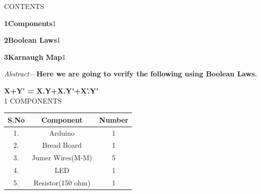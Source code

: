 \documentclass[a4paper,12pt]{report}
\begin{document}
\begin{multicols}{2}
\centering \large\textsc{C}\footnotesize\textsc{ONTENTS}\vspace{5mm}
\\
\raggedright\large\textbf{1\hspace{1cm}Components}\hspace{4.18cm}1\vspace{5mm}\\
\raggedright\large\textbf{2\hspace{1cm}Boolean Laws}\hspace{3.85cm}1\vspace{5mm}\\
\raggedright\large\textbf{3\hspace{1cm}Karnaugh Map}\hspace{3.5cm}1\vspace{5mm}\\


\raggedright\hspace{1cm}\normalsize\textsl{Abstract---}\normalsize\textbf{Here we are going to verify the following using Boolean Laws.}\vspace{1mm}\\
\raggedright\small\textbf{X+Y' = X.Y+X.Y'+X'.Y'}\vspace{5mm}\\


\centering \large\textsc{1  C}\footnotesize\textsc{OMPONENTS}\vspace{5mm}\\
\begin{center}
    \label{tab:truthtable}
    \setlength{\arrayrulewidth}{0.2mm}
\setlength{\tabcolsep}{5pt}
\renewcommand{\arraystretch}{2}
    \begin{tabular}{|c|c|c|}
    \hline %
      \large\textbf{S.No} & \large\textbf{Component} & \large\textbf{Number}\\
      \hline
	\large 1. & \large Arduino & \large 1 \\
	\large 2. & \large Bread Board & \large 1 \\
	\large 3. & \large Jumer Wires(M-M) & \large 5 \\
	\large 4. & \large LED & \large 1 \\
	\large 5. & \large Resistor(150 ohm) & \large 1 \\ 
      \hline
   \end{tabular}
 \end{center}\vspace{5mm} 



\end{multicols}
\end{document}
